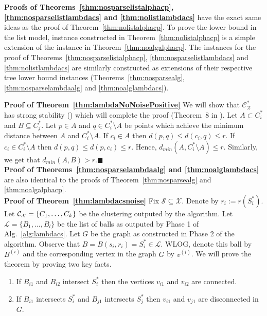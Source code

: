 \documentclass[orivec]{llncs}
\newcommand{\mc}{\mathcal}
\renewcommand{\qed}{\hfill\ensuremath{\blacksquare}}
\renewcommand\labelitemi{$\bullet$}
\begin{document}
\noindent\textbf{Proofs of Theorems~\ref{thm:nosparselistalphacp}, \ref{thm:nosparselistlambdacs} and \ref{thm:nolistlambdacs}} have the exact same ideas as the proof of Theorem~\ref{thm:nolistalphacp}. To prove the lower bound in the list model, instance constructed in Theorem~\ref{thm:nolistalphacp} is a simple extension of the instance in Theorem~\ref{thm:noalgalphacp}. The instances for the proof of Theorems~\ref{thm:nosparselistalphacp}, \ref{thm:nosparselistlambdacs} and \ref{thm:nolistlambdacs} are similarly constructed as extensions of their respective tree lower bound instances (Theorems~\ref{thm:nosparsealg}, \ref{thm:nosparselambdaalg} and \ref{thm:noalglambdacs}).

\noindent\textbf{Proof of Theorem~\ref{thm:lambdaNoNoisePositive}}
We will show that $\mc C_{\mc X}^*$ has strong stability (\cite{balcan2008discriminative}) which will complete the proof (Theorem~8 in \cite{balcan2008discriminative}). Let $A \subset C_i^*$ and $B \subseteq C_j^*$. Let $p \in A$ and $q \in C_i^* \setminus A$ be points which achieve the minimum distance between $A$ and $C_i^*\setminus A$. If $c_i \in A$ then $d(p, q) \le d(c_i, q) \le r$. If $c_i \in C_i^* \setminus A$ then $d(p, q) \le d(p, c_i) \le r$. Hence, $d_{min} (A, C_i^*\setminus A) \le r$. Similarly, we get that $d_{min}(A, B) > r$.\qed\\

\noindent\textbf{Proof of Theorems~\ref{thm:nosparselambdaalg} and \ref{thm:noalglambdacs}} are also identical to the proofs of Theorem~\ref{thm:nosparsealg} and \ref{thm:noalgalphacp}.\\

\noindent\textbf{Proof of Theorem~\ref{thm:lambdacsnoise}}
Fix $\mc S \subseteq \mc X$. Denote by $r_i := r(S_i^*)$. Let $\mc C_{\mc X} = \{C_1, \ldots, \\C_k\}$ be the clustering outputed by the algorithm. Let $\mc L = \{B_1, \ldots, B_l\}$ be the list of balls as outputed by Phase 1 of Alg.~\ref{alg:lambdacs}. Let $G$ be the graph as constructed in Phase 2 of the algorithm. Observe that $B = B(s_i, r_i) = S_i^* \in \mc L$. WLOG, denote this ball by $B^{(i)}$ and the corresponding vertex in the graph $G$ by $v^{(i)}$. We will prove the theorem by proving two key facts.  

\begin{enumerate}[nolistsep,noitemsep,label=\textbf{F.\arabic*},leftmargin=0.3in]
\renewcommand\labelitemi{$\diamond$}
\item \label{fact:lambda1} If $B_{i1}$ and $B_{i2}$ intersect $S_i^*$ then the vertices $v_{i1}$ and $v_{i2}$ are connected.
\item \label{fact:lambda2} If $B_{i1}$ intersects $S_i^*$ and $B_{j1}$ intersects $S_j^*$ then $v_{i1}$ and $v_{j1}$ are disconnected in $G$.	
\end{enumerate}
\end{document}
